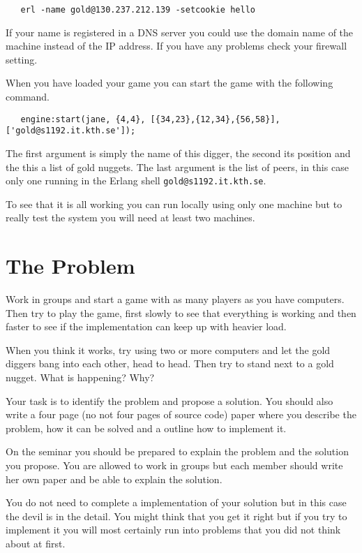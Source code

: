 \documentclass[a4paper,11pt]{article}
\begin{document}
\begin{verbatim}
   erl -name gold@130.237.212.139 -setcookie hello
\end{verbatim}

If your name is registered in a DNS server you could use the domain
name of the machine instead of the IP address. If you have any
problems check your firewall setting.

When you have loaded your game you can start the game with the
following command.

\begin{verbatim}
   engine:start(jane, {4,4}, [{34,23},{12,34},{56,58}], ['gold@s1192.it.kth.se']);
\end{verbatim}

The first argument is simply the name of this digger, the second its
position and the this a list of gold nuggets. The last argument is
the list of peers, in this case only one running in the Erlang shell
{\tt gold@s1192.it.kth.se}.

To see that it is all working you can run locally using only one
machine but to really test the system you will need at least two
machines.

\section{The Problem}

Work in groups and start a game with as many players as you have
computers. Then try to play the game, first slowly to see that
everything is working and then faster to see if the implementation can
keep up with heavier load.

When you think it works, try using two or more computers and let the
gold diggers bang into each other, head to head. Then try to stand next to 
a gold nugget. What is happening? Why?

Your task is to identify the problem and propose a solution. You
should also write a four page (no not four pages of source code) paper
where you describe the problem, how it can be solved and a outline how
to implement it.

On the seminar you should be prepared to explain the problem and the
solution you propose. You are allowed to work in groups but each
member should write her own paper and be able to explain the solution.

You do not need to complete a implementation of your solution but in
this case the devil is in the detail. You might think that you get it
right but if you try to implement it you will most certainly run into
problems that you did not think about at first. 
\end{document}
